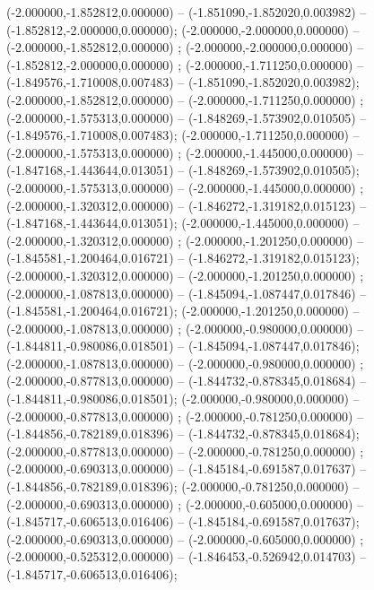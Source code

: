  (-2.000000,-1.852812,0.000000) -- (-1.851090,-1.852020,0.003982) -- (-1.852812,-2.000000,0.000000);
 (-2.000000,-2.000000,0.000000) -- (-2.000000,-1.852812,0.000000) ;
 (-2.000000,-2.000000,0.000000) -- (-1.852812,-2.000000,0.000000) ;
 (-2.000000,-1.711250,0.000000) -- (-1.849576,-1.710008,0.007483) -- (-1.851090,-1.852020,0.003982);
 (-2.000000,-1.852812,0.000000) -- (-2.000000,-1.711250,0.000000) ;
 (-2.000000,-1.575313,0.000000) -- (-1.848269,-1.573902,0.010505) -- (-1.849576,-1.710008,0.007483);
 (-2.000000,-1.711250,0.000000) -- (-2.000000,-1.575313,0.000000) ;
 (-2.000000,-1.445000,0.000000) -- (-1.847168,-1.443644,0.013051) -- (-1.848269,-1.573902,0.010505);
 (-2.000000,-1.575313,0.000000) -- (-2.000000,-1.445000,0.000000) ;
 (-2.000000,-1.320312,0.000000) -- (-1.846272,-1.319182,0.015123) -- (-1.847168,-1.443644,0.013051);
 (-2.000000,-1.445000,0.000000) -- (-2.000000,-1.320312,0.000000) ;
 (-2.000000,-1.201250,0.000000) -- (-1.845581,-1.200464,0.016721) -- (-1.846272,-1.319182,0.015123);
 (-2.000000,-1.320312,0.000000) -- (-2.000000,-1.201250,0.000000) ;
 (-2.000000,-1.087813,0.000000) -- (-1.845094,-1.087447,0.017846) -- (-1.845581,-1.200464,0.016721);
 (-2.000000,-1.201250,0.000000) -- (-2.000000,-1.087813,0.000000) ;
 (-2.000000,-0.980000,0.000000) -- (-1.844811,-0.980086,0.018501) -- (-1.845094,-1.087447,0.017846);
 (-2.000000,-1.087813,0.000000) -- (-2.000000,-0.980000,0.000000) ;
 (-2.000000,-0.877813,0.000000) -- (-1.844732,-0.878345,0.018684) -- (-1.844811,-0.980086,0.018501);
 (-2.000000,-0.980000,0.000000) -- (-2.000000,-0.877813,0.000000) ;
 (-2.000000,-0.781250,0.000000) -- (-1.844856,-0.782189,0.018396) -- (-1.844732,-0.878345,0.018684);
 (-2.000000,-0.877813,0.000000) -- (-2.000000,-0.781250,0.000000) ;
 (-2.000000,-0.690313,0.000000) -- (-1.845184,-0.691587,0.017637) -- (-1.844856,-0.782189,0.018396);
 (-2.000000,-0.781250,0.000000) -- (-2.000000,-0.690313,0.000000) ;
 (-2.000000,-0.605000,0.000000) -- (-1.845717,-0.606513,0.016406) -- (-1.845184,-0.691587,0.017637);
 (-2.000000,-0.690313,0.000000) -- (-2.000000,-0.605000,0.000000) ;
 (-2.000000,-0.525312,0.000000) -- (-1.846453,-0.526942,0.014703) -- (-1.845717,-0.606513,0.016406);
